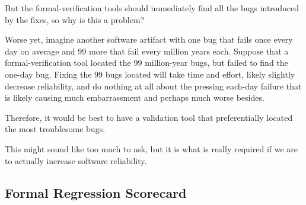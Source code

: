 \QuickQuiz{}
	But the formal-verification tools should immediately find all the
	bugs introduced by the fixes, so why is this a problem?
 \QuickQuizEnd

Worse yet, imagine another software artifact with one bug that fails
once every day on average and 99 more that fail every million years
each.
Suppose that a formal-verification tool located the 99 million-year
bugs, but failed to find the one-day bug.
Fixing the 99 bugs located will take time and effort, likely slightly
decrease reliability, and do nothing at all about the pressing
each-day failure that is likely causing much embarrassment and perhaps
much worse besides.

Therefore, it would be best to have a validation tool that
preferentially located the most troublesome bugs.

This might sound like too much to ask, but it is what is really
required if we are to actually increase software reliability.

\subsection{Formal Regression Scorecard}
\label{sec:formal:Formal Regression Scorecard}

